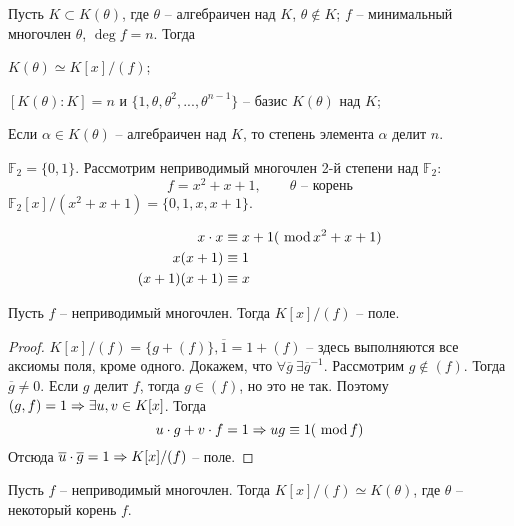 \begin{Thm}
	Пусть $K \subset K(\theta)$, где $\theta$ -- алгебраичен над $K$, $\theta \notin K$; $f$ -- минимальный многочлен $\theta$, $\deg f = n$.
	Тогда 
	\begin{MyList}
		\item $K(\theta) \simeq K[x] / (f)$;
		\item $[K(\theta) : K] = n$ и $\{1, \theta, \theta^2, ..., \theta^{n - 1}\}$ -- базис $K(\theta)$ над $K$;
		\item Если $\alpha \in K(\theta)$ -- алгебраичен над $K$, то степень элемента $\alpha$ делит $n$.  
	\end{MyList} 
\end{Thm}

\begin{Example}
	$\mathbb{F}_2 = \{0, 1\}$. Рассмотрим неприводимый многочлен 2-й степени над $\mathbb{F}_2$:
	\[f = x^2 + x + 1, \qquad \theta \text{ -- корень}\]
	$\mathbb{F}_2[x] / (x^2 + x + 1) = \{0, 1, x, x + 1\}$.

	\begin{align*}
		x \cdot x &\equiv x + 1 (\ \mathrm{mod}\, x^2 + x + 1) \\
		x (x + 1) &\equiv 1 \\
		(x + 1)(x + 1) &\equiv x
	\end{align*}

\end{Example}

\begin{Lm}
	Пусть $f$ -- неприводимый многочлен. Тогда $K[x]/(f)$ -- поле.
\end{Lm}

\begin{proof}
	$K[x]/(f) = \{g + (f)\}, \overline{1} = 1 + (f)$ -- здесь выполняются все аксиомы поля, кроме одного.
	Докажем, что $\forall \overline{g} \ \exists \overline{g}^{-1}$. Рассмотрим $g \notin (f)$. Тогда $\overline{g} \neq 0$. Если $g$ делит $f$, тогда $g \in (f)$, но это не так.
	Поэтому $(g, f) = 1 \Rightarrow \exists u, v \in K[x]$. Тогда
	\[u \cdot g + v \cdot f = 1 \Rightarrow ug \equiv 1 (\ \mathrm{mod}\, f)\]
	Отсюда $\overline{u} \cdot \overline{g} = 1 \Rightarrow K[x] / (f)$ -- поле.
\end{proof}

\begin{Thm}
	Пусть $f$ -- неприводимый многочлен. Тогда $K[x] / (f) \simeq K(\theta)$, где $\theta$ -- некоторый корень $f$.  
\end{Thm}

